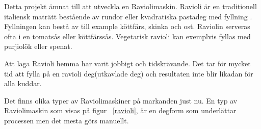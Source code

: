 Detta projekt ämnat till att utveckla en Raviolimaskin. Ravioli är en traditionell italiensk maträtt bestående av rundor eller kvadratiska pastadeg med fyllning \cite{engproc}. Fyllningen kan bestå av till example köttfärs, skinka och ost. Raviolin serveras ofta i en tomatsås eller köttfärssås. Vegetarisk ravioli kan exemplvis fyllas med purjiolök eller spenat.\medskip

Att laga Ravioli hemma har varit jobbigt och tidskrävande. Det tar för mycket tid att fylla på en ravioli deg(utkavlade deg) och resultaten inte blir likadan för alla kuddar.\medskip

Det finns olika typer av Raviolimaskiner på markanden just nu. En typ av Raviolimaskin som visas på figur ~\ref{ravioli}, är en degform som underlättar processen men det mesta görs manuellt.\medskip

